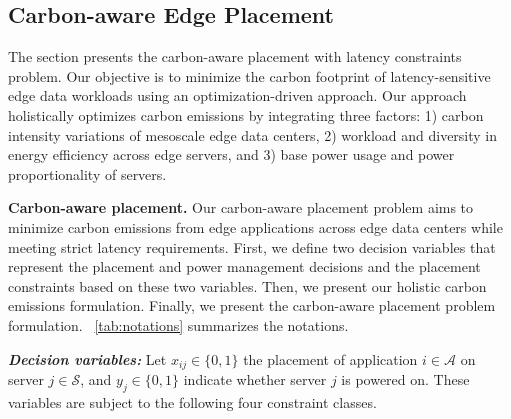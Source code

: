 \subsection{Carbon-aware Edge Placement}
\label{sec:design_problem}

The section presents the carbon-aware placement with latency constraints problem.  %
Our objective is to minimize the carbon footprint of latency-sensitive edge data workloads using an optimization-driven approach. Our approach holistically optimizes carbon emissions by integrating three factors: 1) carbon intensity variations of mesoscale edge data centers, 2) workload and diversity in energy efficiency across edge servers, and 3) base power usage and power proportionality of servers.




\noindent \textbf{Carbon-aware placement.} Our carbon-aware placement problem aims to minimize carbon emissions 
from edge applications across edge data centers while meeting strict latency requirements. %
First, we define two decision variables that represent the placement and power management decisions and the placement constraints based on these two variables. Then, we present our holistic carbon emissions formulation. 
Finally, we present the carbon-aware placement problem formulation. ~\autoref{tab:notations} summarizes the notations. 

\noindent\emph{\textbf{Decision variables:}} Let $x_{ij} \in \{0, 1\}$ the placement of application $i \in \mathcal{A}$ on server $j \in \mathcal{S}$, and $y_j \in \{0, 1\}$ indicate whether server $j$ is powered on. These variables are subject to the following four constraint classes.

